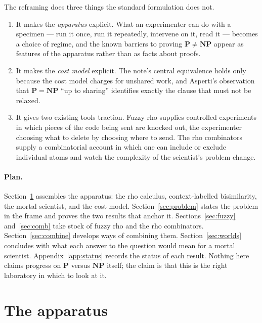 \documentclass[11pt]{article}
\theoremstyle{definition}
\theoremstyle{plain}
\theoremstyle{remark}
\newcommand{\Pclass}{\mathbf{P}}
\newcommand{\NPclass}{\mathbf{NP}}
\begin{document}
\medskip
\noindent
The reframing does three things the standard formulation does not.
\begin{enumerate}[label=(\arabic*),leftmargin=2.2em]
\item It makes the \emph{apparatus} explicit. What an experimenter can do
with a specimen --- run it once, run it repeatedly, intervene on it, read
it --- becomes a choice of regime, and the known barriers to proving
$\Pclass \neq \NPclass$ appear as features of the apparatus rather than
as facts about proofs.
\item It makes the \emph{cost model} explicit. The note's central
equivalence holds only because the cost model charges for unshared work,
and Asperti's observation that $\Pclass = \NPclass$ ``up to sharing''
\cite{AspertiSharing} identifies exactly the clause that must not be
relaxed.
\item It gives two existing tools traction. Fuzzy rho \cite{FuzzyRho}
supplies controlled experiments in which pieces of the code being sent
are knocked out, the experimenter choosing what to delete by choosing
where to send. The rho combinators \cite{RhoComb} supply a
combinatorial account in which one can include or exclude individual
atoms and watch the complexity of the scientist's problem change.
\end{enumerate}

\paragraph{Plan.} Section~\ref{sec:apparatus} assembles the apparatus:
the rho calculus, context-labelled bisimilarity, the mortal scientist,
and the cost model. Section~\ref{sec:problem} states the problem in the
frame and proves the two results that anchor it.
Sections~\ref{sec:fuzzy} and~\ref{sec:comb} take stock of fuzzy rho and
the rho combinators. Section~\ref{sec:combine} develops ways of combining
them. Section~\ref{sec:worlds} concludes with what each answer to the
question would mean for a mortal scientist. Appendix~\ref{app:status}
records the status of each result. Nothing here claims progress on
$\Pclass$ versus $\NPclass$ itself; the claim is that this is the right
laboratory in which to look at it.

\section{The apparatus}\label{sec:apparatus}
\end{document}
